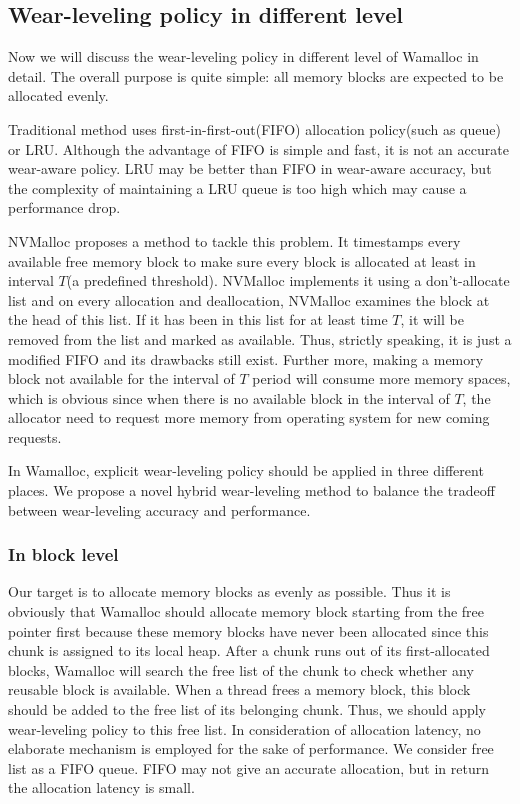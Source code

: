 \documentclass[10pt, conference, compsocconf]{IEEEtran}
\begin{document}
\subsection{Wear-leveling policy in different level}

Now we will discuss the wear-leveling policy in different level of Wamalloc in detail.
The overall purpose is quite simple: all memory blocks are expected to be allocated evenly.

Traditional method uses first-in-first-out(FIFO) allocation policy(such as queue) 
or LRU\cite{zhou2009durable}\cite{rodriguez2015write}.
Although the advantage of FIFO is simple and fast, it is not an accurate wear-aware policy.
LRU may be better than FIFO in wear-aware accuracy, but the complexity of maintaining a LRU queue is too high which may cause a performance drop.

NVMalloc\cite{moraru2013consistent} proposes a method to tackle this problem.
It timestamps every available free memory block to make sure every block is allocated at least in interval $T$(a predefined threshold).
NVMalloc implements it using a don't-allocate list and on every allocation and deallocation,
NVMalloc examines the block at the head of this list.
If it has been in this list for at least time $T$,
it will be removed from the list and marked as available.
Thus, strictly speaking, it is just a modified FIFO and its drawbacks still exist.
Further more, making a memory block not available for the interval of $T$ period will consume more memory spaces,
which is obvious since when there is no available block in the interval of $T$, 
the allocator need to request more memory from operating system for new coming requests.

In Wamalloc, explicit wear-leveling policy should be applied in three different places. 
We propose a novel hybrid wear-leveling method to balance the tradeoff between wear-leveling accuracy and performance.

\subsubsection{In block level}
Our target is to allocate memory blocks as evenly as possible.
Thus it is obviously that Wamalloc should allocate memory block starting from the free pointer first
because these memory blocks have never been allocated since this chunk is assigned to its local heap.
After a chunk runs out of its first-allocated blocks, 
Wamalloc will search the free list of the chunk to check whether any reusable block is available.
When a thread frees a memory block, this block should be added to the free list of its belonging chunk.
Thus, we should apply wear-leveling policy to this free list.
In consideration of allocation latency, no elaborate mechanism is employed for the sake of performance.
We consider free list as a FIFO queue.
FIFO may not give an accurate allocation, but in return the allocation latency is small.
\end{document}

